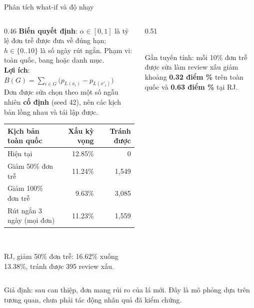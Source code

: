 \documentclass[aspectratio=169,10pt,xcolor=table]{beamer}
\begin{document}
\begin{frame}{Phân tích what-if và độ nhạy}
  \begin{columns}[T]
    \begin{column}{0.46\textwidth}
      \footnotesize
      \textbf{Biến quyết định}: $\alpha\in[0,1]$ là tỷ lệ đơn trễ được đưa về đúng hạn; $h\in\{0..10\}$ là số ngày rút ngắn. Phạm vi: toàn quốc, bang hoặc danh mục.\\[0.1cm]
      \textbf{Lợi ích}: $B(G)=\sum_{i\in G}\big(p_{L(x_i)} - p_{L(x'_i)}\big)$\\[0.1cm]
      Đơn được sửa chọn theo một số ngẫu nhiên \textbf{cố định} (seed 42), nên các kịch bản lồng nhau và tái lập được.\\[0.15cm]
      \begin{tabular}{@{}lrr@{}}
        \toprule
        Kịch bản toàn quốc & Xấu kỳ vọng & Tránh được\\
        \midrule
        Hiện tại & 12.85\% & 0\\
        Giảm 50\% đơn trễ & 11.24\% & 1,549\\
        Giảm 100\% đơn trễ & 9.63\% & 3,085\\
        Rút ngắn 3 ngày (mọi đơn) & 11.23\% & 1,559\\
        \bottomrule
      \end{tabular}\\[0.1cm]
      {\scriptsize RJ, giảm 50\% đơn trễ: 16.62\% xuống 13.38\%, tránh được 395 review xấu.\par}
    \end{column}
    \begin{column}{0.51\textwidth}
      \centering
      \\
      \footnotesize
      Gần tuyến tính: mỗi 10\% đơn trễ được sửa làm review xấu giảm khoảng \textbf{0.32 điểm \%} trên toàn quốc và \textbf{0.63 điểm \%} tại RJ.
    \end{column}
  \end{columns}
  \vspace{0.05cm}
  {\tiny\color{muted}\hspace{0.3cm}Giả định: sau can thiệp, đơn mang rủi ro của lá mới. Đây là mô phỏng dựa trên tương quan, chưa phải tác động nhân quả đã kiểm chứng.\par}
\end{frame}
\end{document}
